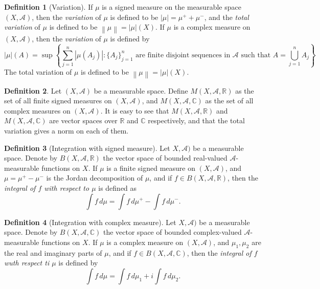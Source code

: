 \documentclass[12pt]{article}
\theoremstyle{definition}
\newtheorem{definition}{Definition}[section]
\newcommand{\real}{\mathbb{R}}   %
\newcommand{\C}{\mathbb{C}}    %
\newcommand{\algebra}{\mathscr{A}}
\newcommand\norm[1]{\left\lVert#1\right\rVert}
\begin{document}
\begin{definition}[Variation]
    If $\mu$ is a signed measure on the measurable space $(X,\algebra)$, then the \textit{variation} of $\mu$ is defined to be $|\mu|=\mu^++\mu^-$, and the \textit{total variation} of $\mu$ is defined to be $\norm{\mu}=|\mu|(X)$. If $\mu$ is a complex measure on $(X,\algebra)$, then the \textit{variation} of $\mu$ is defined by 
    \begin{equation*}
        |\mu|(A)=\sup\left\{\sum_{j=1}^n|\mu(A_j)|: \{A_j\}_{j=1}^n \text{ are finite disjoint sequences in $\algebra$ such that } A=\bigcup_{j=1}^n A_j\right\}.
    \end{equation*}
    The total variation of $\mu$ is defined to be $\norm{\mu}=|\mu|(X)$.
\end{definition}
\begin{definition}
    Let $(X,\algebra)$ be a measurable space. Define $M(X,\algebra,\real)$ as the set of all finite signed measures on $(X,\algebra)$, and $M(X,\algebra,\C)$ as the set of all complex measures on $(X,\algebra)$. It is easy to see that $M(X,\algebra,\real)$ and $M(X,\algebra,\C)$ are vector spaces over $\real$ and $\C$ respectively, and that the total variation gives a norm on each of them.
\end{definition}
\begin{definition}[Integration with signed measure]
    Let $X,\algebra)$ be a measurable space. Denote by $B(X,\algebra,\real)$ the vector space of bounded real-valued $\algebra$-measurable functions on $X$. If $\mu$ is a finite signed measure on $(X,\algebra)$, and $\mu=\mu^+-\mu^-$ is the Jordan decomposition of $\mu$, and if $f\in B(X,\algebra,\real)$, then the \textit{integral of $f$ with respect to $\mu$} is defined as
    \begin{equation*}
        \int f \, d\mu=\int f\, d\mu^+-\int f\, d\mu^-.
    \end{equation*}
\end{definition}
\begin{definition}[Integration with complex measure]
    Let $X,\algebra)$ be a measurable space. Denote by $B(X,\algebra,\C)$ the vector space of bounded complex-valued $\algebra$-measurable functions on $X$. If $\mu$ is a complex measure on $(X,\algebra)$, and $\mu_1,\mu_2$ are the real and imaginary parts of $\mu$, and if $f\in B(X,\algebra,\C)$, then the \textit{integral of $f$ wuth respect ti $\mu$} is defined by
    \begin{equation*}
        \int f\,d\mu=\int f\,d\mu_1+i\int f \,d\mu_2.
    \end{equation*}
\end{definition}
\end{document}
